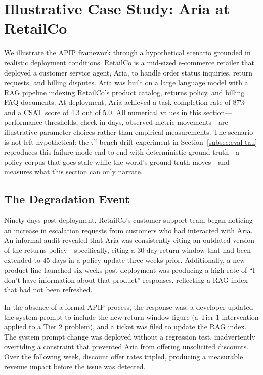 \section{Illustrative Case Study: Aria at RetailCo}
\label{sec:case-study}

We illustrate the APIP framework through a hypothetical scenario grounded in
realistic deployment conditions. RetailCo is a mid-sized e-commerce retailer
that deployed a customer service agent, Aria, to handle order status inquiries,
return requests, and billing disputes. Aria was built on a large language model
with a RAG pipeline indexing RetailCo's product catalog, returns policy, and
billing FAQ documents. At deployment, Aria achieved a task completion rate of
87\% and a CSAT score of 4.3 out of 5.0. All numerical values in this
section---performance thresholds, check-in days, observed metric
movements---are illustrative parameter choices rather than empirical
measurements. The scenario is not left hypothetical: the
$\tau^2$-bench drift experiment in Section~\ref{subsec:eval-tau} reproduces
this failure mode end-to-end with deterministic ground truth---a policy
corpus that goes stale while the world's ground truth moves---and measures
what this section can only narrate.

\subsection{The Degradation Event}
\label{subsec:degradation-event}

Ninety days post-deployment, RetailCo's customer support team began noticing an
increase in escalation requests from customers who had interacted with Aria. An
informal audit revealed that Aria was consistently citing an outdated version
of the returns policy---specifically, citing a 30-day return window that had
been extended to 45 days in a policy update three weeks prior. Additionally, a
new product line launched six weeks post-deployment was producing a high rate
of ``I don't have information about that product'' responses, reflecting a RAG
index that had not been refreshed.

In the absence of a formal APIP process, the response was: a developer updated
the system prompt to include the new return window figure (a Tier 1
intervention applied to a Tier 2 problem), and a ticket was filed to update the
RAG index. The system prompt change was deployed without a regression test,
inadvertently overriding a constraint that prevented Aria from offering
unsolicited discounts. Over the following week, discount offer rates tripled,
producing a measurable revenue impact before the issue was detected.

